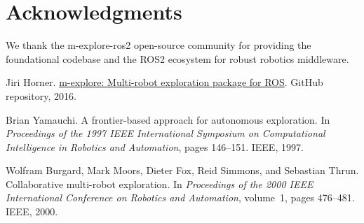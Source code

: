 \documentclass[conference]{IEEEtran}
\begin{document}
\section*{Acknowledgments}

We thank the m-explore-ros2 open-source community for providing the foundational codebase and the ROS2 ecosystem for robust robotics middleware.


\begin{thebibliography}{1}

Jiri Horner.
\newblock \href{https://github.com/hrnr/m-explore}{m-explore: Multi-robot exploration package for ROS}.
\newblock GitHub repository, 2016.

Brian Yamauchi.
\newblock A frontier-based approach for autonomous exploration.
\newblock In \emph{Proceedings of the 1997 IEEE International Symposium on Computational Intelligence in Robotics and Automation}, pages 146--151. IEEE, 1997.

Wolfram Burgard, Mark Moors, Dieter Fox, Reid Simmons, and Sebastian Thrun.
\newblock Collaborative multi-robot exploration.
\newblock In \emph{Proceedings of the 2000 IEEE International Conference on Robotics and Automation}, volume~1, pages 476--481. IEEE, 2000.

\end{thebibliography}
\end{document}
